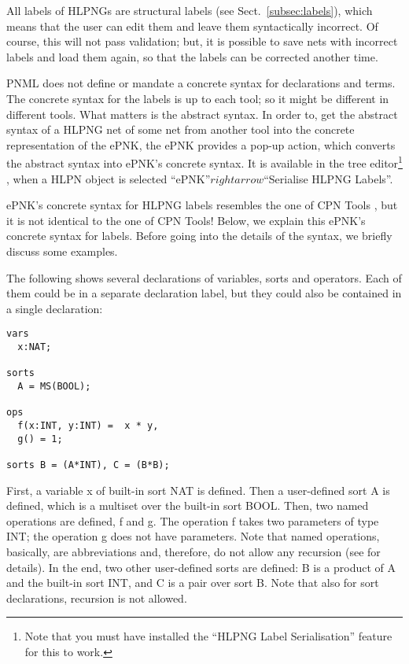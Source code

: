 All labels of HLPNGs are structural labels (see Sect.~\ref{subsec:labels}),
which means that the user can edit them and leave them syntactically incorrect.
Of course, this will not pass validation; but, it is possible to save
nets with incorrect labels and load them again, so that the labels can
be corrected another time.

PNML does not define or mandate a concrete syntax for declarations and terms.
The concrete syntax for the labels is up to each tool; so it might be different
in different tools. What matters is the abstract syntax. In order to, get
the abstract syntax of a HLPNG net of some net from another tool into the
concrete representation of the ePNK, the ePNK provides a pop-up action,
which converts the abstract syntax into ePNK's concrete syntax. It is
available in the tree editor\footnote
  {Note that you must have installed the ``HLPNG Label Serialisation'' feature
   for this to work.}%
, when a HLPN object is selected ``ePNK''$rightarrow$``Serialise HLPNG
Labels''.%

ePNK's concrete syntax for HLPNG labels resembles the one of CPN Tools
\cite{JeKr09}, but it is not identical to the one of CPN Tools! Below, we
explain this ePNK's concrete syntax for labels. Before going into the details
of the syntax, we briefly discuss some examples.

The following shows several declarations of variables, sorts and operators.
Each of them could be in a separate declaration label, but they could also be
contained in a single declaration:
\begin{verbatim} 
vars
  x:NAT;
  
sorts
  A = MS(BOOL);
  
ops
  f(x:INT, y:INT) =  x * y,
  g() = 1;
  
sorts B = (A*INT), C = (B*B);    
\end{verbatim}

First, a variable x of built-in sort NAT is defined. Then a user-defined
sort A is defined, which is a multiset over the built-in sort BOOL. Then,
two named operations are defined, f and g. The operation f takes two parameters
of type INT; the operation g does not have parameters. Note that named
operations, basically, are abbreviations and, therefore, do not allow any
recursion (see \cite{HKea09} for details). In the end, two other user-defined
sorts are defined: B is a product of A and the built-in sort INT, and C is a pair over
sort B. Note that also for sort declarations, recursion is not allowed.

